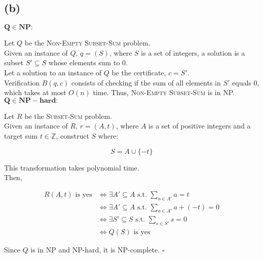 \newpage
\subsection*{(b)}

\(\mathbf{Q \in NP:}\)

Let \( Q \) be the \textsc{Non-Empty Subset-Sum} problem.\\
Given an instance of \( Q \), \( q = (S) \), 
where \( S \) is a set of integers, a solution is a subset \( S' \subseteq S \) whose elements sum to \( 0 \).\\
Let a solution to an instance of \( Q \) be the certificate, \( c = S' \).\\

Verification \( B(q,c) \) consists of checking if the sum of all elements in \( S' \) equals \( 0 \), which takes at most \( O(n) \) time. Thus, \textsc{Non-Empty Subset-Sum} is in NP.\\

\(\mathbf{Q \in NP-hard:}\)

Let \( R \) be the \textsc{Subset-Sum} problem.\\
Given an instance of \( R \), \( r = (A, t) \), 
where \( A \) is a set of positive integers and a target sum \( t \in \mathbb{Z} \), construct \( S \) where:

\[
S = A \cup \{-t\}
\]

This transformation takes polynomial time.\\

Then,

\begin{equation}
    \begin{split}
        R(A, t) \text{ is yes} &\iff \exists A' \subseteq A \text{ s.t. } \sum_{a \in A'} a = t \\
        &\iff \exists A' \subseteq A \text{ s.t. } \sum_{a \in A'} a + (-t) = 0 \\
        &\iff \exists S' \subseteq S \text{ s.t. } \sum_{s \in S'} s = 0 \\
        &\iff Q(S) \text{ is yes}
    \end{split}
\end{equation}

Since \( Q \) is in NP and NP-hard, it is NP-complete. \(\square\)

